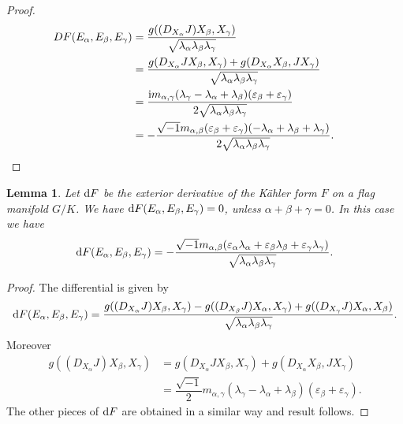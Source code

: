 \documentclass[10pt,a4paper]{amsart}
\numberwithin{equation}{section}
\newtheorem{Lemma}[Theorem]{Lemma}
\begin{document}
\begin{proof}
\begin{align*}
DF(E_{\alpha},E_{\beta},E_{\gamma})&=
\dfrac{g((D_{X_{\alpha}}J)X_{\beta},X_{\gamma})}{\sqrt{\lambda_{\alpha}\lambda_{\beta}\lambda_{\gamma}}}
\\
&=\dfrac{g(D_{X_{\alpha}}JX_{\beta},X_{\gamma})+g(D_{X_{\alpha}}X_{\beta},JX_{\gamma})}
{\sqrt{\lambda_{\alpha}\lambda_{\beta}\lambda_{\gamma}}}
\\
&=\dfrac{{\rm i}m_{\alpha,\gamma}(\lambda_{\gamma}-\lambda_{\alpha}+\lambda_{\beta})
(\varepsilon_{\beta}+\varepsilon_{\gamma})}{2\sqrt{\lambda_{\alpha}\lambda_{\beta}\lambda_{\gamma}}}
\\
&=-\dfrac{\sqrt{-1}m_{\alpha,\beta}(\varepsilon_{\beta}+\varepsilon_{\gamma})(-\lambda_{\alpha} +\lambda_{\beta}+\lambda_{\gamma})}{2\sqrt{\lambda_{\alpha}\lambda_{\beta}\lambda_{\gamma}}}.\tag*{\qed}
\end{align*}
\renewcommand{\qed}{}
\end{proof}



\begin{Lemma}
Let ${\rm d}F$ be the exterior derivative of the K\"ahler form $F$ on a flag manifold $G/K$. We have ${\rm d}F(E_{\alpha},E_{\beta},E_{\gamma})=0$, unless $\alpha+\beta+\gamma=0$. In this case we have
\begin{gather}
{\rm d}F(E_{\alpha},E_{\beta},E_{\gamma})=-\dfrac{\sqrt{-1}m_{\alpha,\beta} (\varepsilon_{\alpha}\lambda_{\alpha}+\varepsilon_{\beta}\lambda_{\beta} +\varepsilon_{\gamma}\lambda_{\gamma})}{\sqrt{\lambda_{\alpha}\lambda_{\beta}\lambda_{\gamma}}}.
\end{gather}
\end{Lemma}
\begin{proof}
The differential is given by
\begin{gather*}
{\rm d}F(E_{\alpha},E_{\beta},E_{\gamma})=\dfrac{g((D_{X_{\alpha}}J)X_{\beta},X_{\gamma}) -g((D_{X_{\beta}}J)X_{\alpha},X_{\gamma})+g((D_{X_{\gamma}}J)X_{\alpha},X_{\beta})} {\sqrt{\lambda_{\alpha}\lambda_{\beta}\lambda_{\gamma}}}.
\end{gather*}
Moreover
\begin{align*}
g((D_{X_{\alpha}}J)X_{\beta},X_{\gamma})&=g(D_{X_{\alpha}}JX_{\beta},X_{\gamma}) +g(D_{X_{\alpha}}X_{\beta},JX_{\gamma})
\\
&=\dfrac{\sqrt{-1}}{2}m_{\alpha,\gamma}(\lambda_{\gamma}-\lambda_{\alpha} +\lambda_{\beta})(\varepsilon_{\beta}+\varepsilon_{\gamma}).
\end{align*}
The other pieces of ${\rm d}F$ are obtained in a similar way and result follows.
\end{proof}
\end{document}
